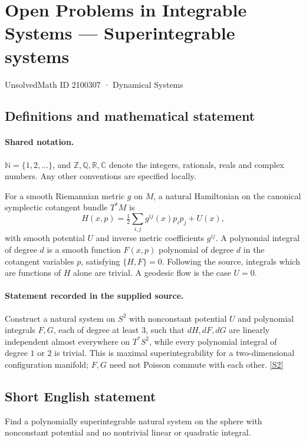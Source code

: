 \documentclass[11pt]{article}
\newcommand{\sref}[2]{\hyperlink{source:#1:#2}{[S#2]}}
\begin{document}
\setcounter{section}{2100306}
\section{Open Problems in Integrable Systems — Superintegrable systems}\label{2100307}
{\small\sffamily UnsolvedMath ID 2100307 · Dynamical Systems}
\subsection{Definitions and mathematical statement}

\paragraph{Shared notation.}$\mathbb N=\{1,2,\ldots\}$, and $\mathbb Z,\mathbb Q,\mathbb R,\mathbb C$ denote the integers, rationals, reals and complex numbers. Any other conventions are specified locally.


For a smooth Riemannian metric $g$ on $M$, a natural Hamiltonian on the canonical symplectic cotangent bundle $T^*M$ is \[H(x,p)=\tfrac12\sum_{i,j}g^{ij}(x)p_ip_j+U(x),\] with smooth potential $U$ and inverse metric coefficients $g^{ij}$. A polynomial integral of degree $d$ is a smooth function $F(x,p)$ polynomial of degree $d$ in the cotangent variables $p$, satisfying $\{H,F\}=0$. Following the source, integrals which are functions of $H$ alone are trivial. A geodesic flow is the case $U=0$.
\paragraph{Statement recorded in the supplied source.}
Construct a natural system on $S^2$ with nonconstant potential $U$ and polynomial integrals $F,G$, each of degree at least $3$, such that $dH,dF,dG$ are linearly independent almost everywhere on $T^*S^2$, while every polynomial integral of degree $1$ or $2$ is trivial. This is maximal superintegrability for a two-dimensional configuration manifold; $F,G$ need not Poisson commute with each other. \sref{2100307}{2}
\subsection{Short English statement}
Find a polynomially superintegrable natural system on the sphere with nonconstant potential and no nontrivial linear or quadratic integral.
\end{document}
